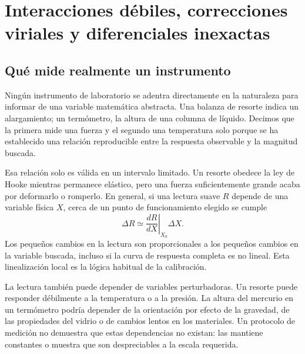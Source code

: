 \chapter{Interacciones débiles, correcciones viriales y diferenciales inexactas}


\section{Qué mide realmente un instrumento}

Ningún instrumento de laboratorio se adentra directamente en la naturaleza para informar de una variable matemática abstracta. Una balanza de resorte indica un alargamiento; un termómetro, la altura de una columna de líquido. Decimos que la primera mide una fuerza y el segundo una temperatura solo porque se ha establecido una relación reproducible entre la respuesta observable y la magnitud buscada.

Esa relación solo es válida en un intervalo limitado. Un resorte obedece la ley de Hooke mientras permanece elástico, pero una fuerza suficientemente grande acaba por deformarlo o romperlo. En general, si una lectura suave \(R\) depende de una variable física \(X\), cerca de un punto de funcionamiento elegido se cumple \begin{equation}
 \Delta R \simeq
 \left.\frac{dR}{dX}\right|_{X_0}\Delta X.
 \label{eq:sm6-local-linear-response}
\end{equation} Los pequeños cambios en la lectura son proporcionales a los pequeños cambios en la variable buscada, incluso si la curva de respuesta completa es no lineal. Esta linealización local es la lógica habitual de la calibración.

La lectura también puede depender de variables perturbadoras. Un resorte puede responder débilmente a la temperatura o a la presión. La altura del mercurio en un termómetro podría depender de la orientación por efecto de la gravedad, de las propiedades del vidrio o de cambios lentos en los materiales. Un protocolo de medición no demuestra que estas dependencias no existan: las mantiene constantes o muestra que son despreciables a la escala requerida.

